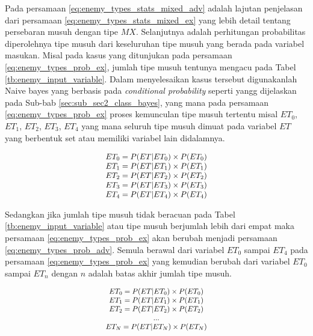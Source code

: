 Pada persamaan \ref{eq:enemy_types_stats_mixed_adv} adalah lajutan penjelasan dari persamaan \ref{eq:enemy_types_stats_mixed_ex} yang lebih detail tentang persebaran musuh dengan tipe $MX$. Selanjutnya adalah perhitungan probabilitas diperolehnya tipe musuh dari keseluruhan tipe musuh yang berada pada variabel masukan. Misal pada kasus yang ditunjukan pada persamaan \ref{eq:enemy_types_prob_ex}, jumlah tipe musuh tentunya mengacu pada Tabel \ref{tb:enemy_input_variable}. Dalam menyelesaikan kasus tersebut digunakanlah Naive bayes yang berbasis pada \textit{conditional probability} seperti yangg dijelaskan pada Sub-bab \ref{sec:sub_sec2_class_bayes}, yang mana pada persamaan \ref{eq:enemy_types_prob_ex} proses kemunculan tipe musuh tertentu misal $ET_{0}$, $ET_{1}$, $ET_{2}$, $ET_{3}$, $ET_{4}$ yang mana seluruh tipe musuh dimuat pada variabel $ET$ yang berbentuk set atau memiliki variabel lain didalamnya.
\vspace{1ex}

\begin{equation}\label{eq:enemy_types_prob_ex}
\resizebox{0.35\textwidth}{!}{%
	$\begin{matrix}
	ET_{0} = P(ET | ET_{0}) \times P(ET_{0})\\
	ET_{1} = P(ET | ET_{1}) \times P(ET_{1})\\
	ET_{2} = P(ET | ET_{2}) \times P(ET_{2})\\
	ET_{3} = P(ET | ET_{3}) \times P(ET_{3})\\
	ET_{4} = P(ET | ET_{4}) \times P(ET_{4})
	\end{matrix}$%
}
\end{equation}

Sedangkan jika jumlah tipe musuh tidak beracuan pada Tabel \ref{tb:enemy_input_variable} atau tipe musuh berjumlah lebih dari empat maka persamaan \ref{eq:enemy_types_prob_ex} akan berubah menjadi persamaan \ref{eq:enemy_types_prob_adv}. Semula berawal dari variabel $ET_{0}$ sampai $ET_{4}$ pada persamaan \ref{eq:enemy_types_prob_ex} yang kemudian berubah dari variabel $ET_{0}$ sampai $ET_{n}$ dengan $n$ adalah batas akhir jumlah tipe musuh.
\vspace{1ex}

\begin{equation}\label{eq:enemy_types_prob_adv}
\resizebox{0.35\textwidth}{!}{%
	$\begin{matrix}
	ET_{0} = P(ET | ET_{0}) \times P(ET_{0})\\
	ET_{1} = P(ET | ET_{1}) \times P(ET_{1})\\
	ET_{2} = P(ET | ET_{2}) \times P(ET_{2})\\
	...\\
	ET_{N} = P(ET | ET_{N}) \times P(ET_{N})
	\end{matrix}$%
}
\end{equation}

